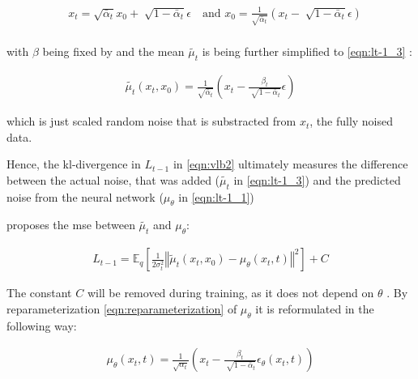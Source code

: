 \begin{equation}
  \begin{align}
    &x_t = \sqrt{\bar{\alpha}_{t}}x_0+\sqrt[]{1-\bar{\alpha}_t}\epsilon \quad\textrm{and }
    x_0 = \frac{1}{\sqrt{\bar{\alpha}_t}}(x_t-\sqrt[]{1-\bar{\alpha}_t}\epsilon) \nonumber\\
  \end{align}
\end{equation}

with $\beta$ being fixed by \cite{ho2020DenoisingDiffusionProbabilistic} and the mean $\tilde{\mu_t}$ is being further simplified to \autoref{eqn:lt-1_3} \cite{ho2020DenoisingDiffusionProbabilistic}:

\begin{equation}
  \begin{align}
    \label{eqn:lt-1_3}
    \tilde{\mu_t}(x_t, x_0) = \frac{1}{\sqrt{\bar{\alpha}_t}}(x_t - \frac{\beta_t}{\sqrt[]{1-\bar{\alpha}_t}}\epsilon)
  \end{align}
\end{equation}

which is just scaled random noise that is substracted from $x_t$, the fully noised data.

Hence, the \gls{kl}-divergence in $L_{t-1}$ in \autoref{eqn:vlb2} ultimately measures the difference between the actual noise, that was added ($\tilde{\mu_t}$ in \autoref{eqn:lt-1_3}) and the predicted noise from the neural network ($\mu_\theta$ in \autoref{eqn:lt-1_1})

\cite{ho2020DenoisingDiffusionProbabilistic} proposes the \gls{mse} between $\tilde{\mu_t}$ and $\mu_\theta$:

\begin{equation}
  \begin{align}
    \label{eqn:mse_loss}
    L_{t-1} = \mathbb{E}_q \left[ \frac{1}{2\sigma_t^2} \left\Vert \tilde{\mu}_t(x_t, x_0) - \mu_\theta(x_t, t) \right\Vert^2 \right] + C
  \end{align}
\end{equation}

The constant $C$ will be removed during training, as it does not depend on $\theta$ \cite{ho2020DenoisingDiffusionProbabilistic}.
By reparameterization \autoref{eqn:reparameterization} of $\mu_\theta$ it is reformulated in the following way:

\begin{equation}
  \begin{align}
    \label{eqn:mse_loss_2}
    \mu_\theta(x_t,t)= \frac{1}{\sqrt{\alpha_t}}(x_t - \frac{\beta_t}{\sqrt[]{1-\bar{\alpha}_t}}\epsilon_\theta(x_t,t)) 
  \end{align}
\end{equation}

